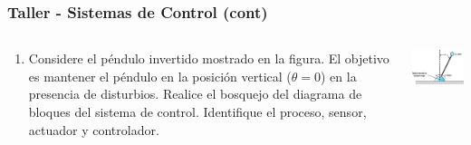 \documentclass[aspectratio=169,handout]{beamer}
\theoremstyle{definition}
\theoremstyle{plain}
\theoremstyle{remark}
\newcounter{saveenumi}
\newcommand{\conti}{\setcounter{enumi}{\value{saveenumi}}}
\begin{document}
\begin{frame}[c]\frametitle{Taller - Sistemas de Control (cont)}
\begin{columns}
  \begin{column}{0.5\textwidth}
    \begin{enumerate}
      \conti
      \item Considere el péndulo invertido mostrado en la figura. El objetivo es mantener el péndulo en la posición vertical ($\theta = 0$) en la presencia de disturbios. Realice el bosquejo del diagrama de bloques del sistema de control. Identifique el proceso, sensor, actuador y controlador.
    \end{enumerate}
  \end{column} 
  \begin{column}{0.5\textwidth}
   \centering
   \includegraphics[width=6cm]{images/invertedpendulum.eps}
  \end{column} 
\end{columns}
\end{frame}
\end{document}
